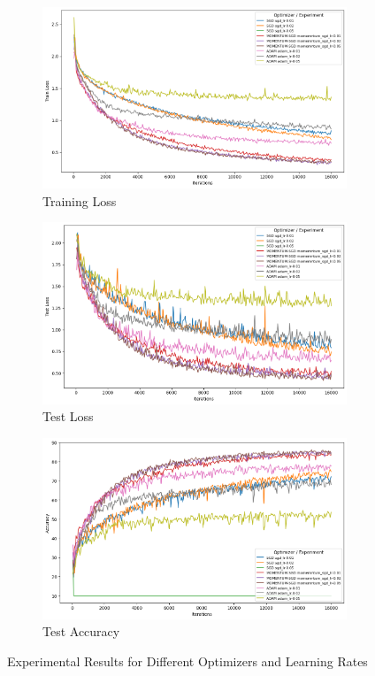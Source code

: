 \documentclass{article}
\begin{document}
\begin{figure}[ht]
  \centering
  \begin{subfigure}{0.45\textwidth}
    \includegraphics[width=\textwidth]{images/q4_train_loss.png}
    \caption{Training Loss}
  \end{subfigure}
  \hspace{0.5cm}
  \begin{subfigure}{0.45\textwidth}
    \includegraphics[width=\textwidth]{images/q4_test_loss.png}
    \caption{Test Loss}
  \end{subfigure}
  
  \begin{subfigure}{0.45\textwidth}
    \includegraphics[width=\textwidth]{images/q4_test_acc.png}
    \caption{Test Accuracy}
  \end{subfigure}
  \caption{Experimental Results for Different Optimizers and Learning Rates}
  \label{fig:exp_results}
\end{figure}
\end{document}
